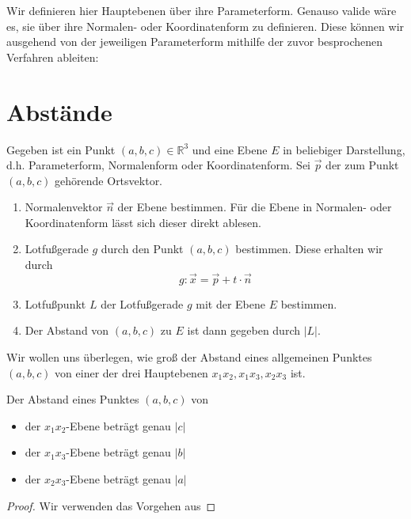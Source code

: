 Wir definieren hier Hauptebenen über ihre Parameterform. Genauso valide wäre es, sie über ihre Normalen- oder Koordinatenform zu definieren. Diese können wir ausgehend von der jeweiligen Parameterform mithilfe der zuvor besprochenen Verfahren ableiten: 

\begin{proposition}
    
\end{proposition}

\section{Abstände}

\begin{problem} Gegeben ist ein Punkt \((a,b,c)\in \mathbb R^3\) und eine Ebene \(E\) in beliebiger Darstellung, d.h. Parameterform, Normalenform oder Koordinatenform. Sei \(\vec p\) der zum Punkt \((a,b,c)\) gehörende Ortsvektor. 
\begin{enumerate}
    \item Normalenvektor \(\vec n\) der Ebene bestimmen. Für die Ebene in Normalen- oder Koordinatenform lässt sich dieser direkt ablesen. 
    \item Lotfußgerade \(g\) durch den Punkt \((a,b,c)\) bestimmen. Diese erhalten wir durch 
    \begin{equation*}
        g: \vec x = \vec p + t\cdot \vec n
    \end{equation*}
    \item Lotfußpunkt \(L\) der Lotfußgerade \(g\) mit der Ebene \(E\) bestimmen. 
    \item Der Abstand von \((a,b,c)\) zu \(E\) ist dann gegeben durch \(|L|\). 
\end{enumerate}
    
\end{problem}

Wir wollen uns überlegen, wie groß der Abstand eines allgemeinen Punktes \((a,b,c)\) von einer der drei Hauptebenen \(x_1x_2, x_1x_3,x_2x_3\) ist.
\begin{proposition}
    Der Abstand eines Punktes \((a,b,c)\) von 
    \begin{itemize}
        \item der \(x_1x_2\)-Ebene beträgt genau \(|c|\)
        \item der \(x_1x_3\)-Ebene beträgt genau \(|b|\)
        \item der \(x_2x_3\)-Ebene beträgt genau \(|a|\)
    \end{itemize}
\end{proposition}
\begin{proof}
    Wir verwenden das Vorgehen aus 
\end{proof}

